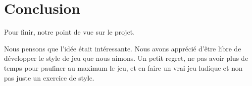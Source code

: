 \chapter{Conclusion}

Pour finir, notre point de vue sur le projet.

Nous pensons que l'idée était intéressante.
Nous avons apprécié d'être libre de développer le style de jeu que nous aimons.
Un petit regret, ne pas avoir plus de temps pour paufiner au maximum le jeu, 
et en faire un vrai jeu ludique et non pas juste un exercice de style.
